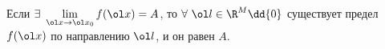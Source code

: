 
	 Если $\exists\ \lim\limits_{\ol x\to \ol x_0}f(\ol x) = A$, то $\forall\ \ol l\in\R^M\dd\{0\}$ существует предел $f(\ol x)$ по направлению $\ol l$, и он равен $A$.
	 